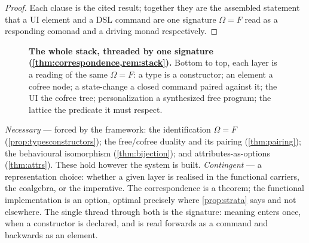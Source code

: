 \documentclass[../uxoxo-main]{subfiles}
\begin{document}
\begin{proof}
Each clause is the cited result; together they are the assembled statement that a
UI element and a DSL command are one signature $\Omega=F$ read as a responding
comonad and a driving monad respectively.
\end{proof}

\begin{figure}[H]
\centering
{}
\caption{\textbf{The whole stack, threaded by one signature
(\cref{thm:correspondence,rem:stack}).} Bottom to top, each layer is a reading of
the same $\Omega=F$: a type is a constructor; an element a cofree node; a
state-change a closed command paired against it; the UI the cofree tree;
personalization a synthesized free program; the lattice the predicate it must
respect.}
\label{fig:stack}
\end{figure}

\begin{remark}\label{rem:necessary}
\emph{Necessary} --- forced by the framework: the identification $\Omega=F$
(\cref{prop:typesconstructors}); the free/cofree duality and its pairing
(\cref{thm:pairing}); the behavioural isomorphism (\cref{thm:bijection}); and
attributes-as-options (\cref{thm:attrs}). These hold however the system is built.
\emph{Contingent} --- a representation choice: whether a given layer is realised in
the functional carriers, the coalgebra, or the imperative. The correspondence is a
theorem; the functional implementation is an option, optimal precisely where
\cref{prop:strata} says and not elsewhere. The single thread through both is the
signature: meaning enters once, when a constructor is declared, and is read
forwards as a command and backwards as an element.
\end{remark}
\end{document}
